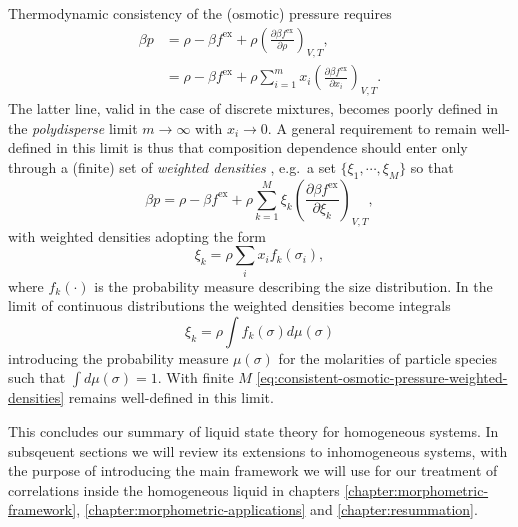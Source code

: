 Thermodynamic consistency of the (osmotic) pressure requires
\begin{subequations}
  \begin{align}
    \label{eq:consistent-osmotic-pressure}
    \beta p
    &=
    \rho - \beta f^\mathrm{ex}
    + \rho \left( \frac{\partial \beta f^\mathrm{ex}}{\partial \rho} \right)_{V,T},
    \\
    \label{eq:consistent-osmotic-pressure-mixtures}
    &=
    \rho - \beta f^\mathrm{ex}
    + \rho \sum_{i=1}^m
    x_i \left( \frac{\partial \beta f^\mathrm{ex}}{\partial x_i} \right)_{V,T}.
  \end{align}
\end{subequations}
The latter line, valid in the case of discrete mixtures, becomes poorly defined in the \emph{polydisperse} limit $m \to \infty$ with $x_i \to 0$.
A general requirement to remain well-defined in this limit is thus that composition dependence should enter only through a (finite) set of \emph{weighted densities} \cite{GualtieriJCP1982, WarrenPRL1998, SollichPRL1998, SollichAiCP2001}, e.g.\ a set $\{\xi_1, \cdots, \xi_M\}$ so that
\begin{equation}\label{eq:consistent-osmotic-pressure-weighted-densities}
  \beta p
  =
  \rho - \beta f^\mathrm{ex}
  + \rho \sum_{k=1}^M
  \xi_k \left( \frac{\partial \beta f^\mathrm{ex}}{\partial \xi_k} \right)_{V,T},
\end{equation}
with weighted densities adopting the form
\begin{equation*}
  \xi_k
  =
  \rho \sum_i x_i f_k(\sigma_i),
\end{equation*}
where $f_k(\cdot)$ is the probability measure describing the size distribution.
In the limit of continuous distributions the weighted densities become integrals
\begin{equation*}
  \xi_k
  =
  \rho \int f_k(\sigma) d\mu(\sigma)
\end{equation*}
introducing the probability measure $\mu(\sigma)$ for the molarities of particle species such that $\int d\mu(\sigma) = 1$.
With finite $M$ \eqref{eq:consistent-osmotic-pressure-weighted-densities} remains well-defined in this limit.

This concludes our summary of liquid state theory for homogeneous systems.
In subsqeuent sections we will review its extensions to inhomogeneous systems, with the purpose of introducing the main framework we will use for our treatment of correlations inside the homogeneous liquid in chapters \ref{chapter:morphometric-framework}, \ref{chapter:morphometric-applications} and \ref{chapter:resummation}.
